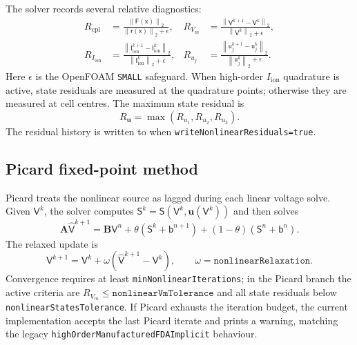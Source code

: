 \documentclass[11pt,a4paper]{article}
\newcommand{\code}[1]{\texttt{\small #1}}
\newcommand{\Vm}{V_m}
\newcommand{\Iion}{I_{\mathrm{ion}}}
\newcommand{\Aimp}{\mathbf{A}}
\newcommand{\Bimp}{\mathbf{B}}
\newcommand{\Fres}{\mathsf{F}}
\newcommand{\norm}[1]{\left\lVert #1 \right\rVert}
\begin{document}
The solver records several relative diagnostics:
\begin{align}
  R_{\mathrm{cpl}} &=
  \frac{\norm{\Fres(\mathsf{x})}_2}
       {\norm{\mathsf{r}(\mathsf{x})}_2+\epsilon},
  &
  R_{\Vm} &=
  \frac{\norm{\mathsf{V}^{k+1}-\mathsf{V}^{k}}_2}
       {\norm{\mathsf{V}^{k}}_2+\epsilon},\\
  R_{\Iion} &=
  \frac{\norm{\mathsf{I}^{k+1}_{\mathrm{ion}}-\mathsf{I}^{k}_{\mathrm{ion}}}_2}
       {\norm{\mathsf{I}^{k}_{\mathrm{ion}}}_2+\epsilon},
  &
  R_{u_j} &=
  \frac{\norm{\mathsf{u}^{k+1}_{j}-\mathsf{u}^{k}_{j}}_2}
       {\norm{\mathsf{u}^{k}_{j}}_2+\epsilon}.
\end{align}
Here $\epsilon$ is the OpenFOAM \code{SMALL} safeguard. When high-order
$\Iion$ quadrature is active, state residuals are measured at the quadrature
points; otherwise they are measured at cell centres. The maximum state residual
is
\begin{equation}
  R_{\mathbf{u}}=\max(R_{u_1},R_{u_2},R_{u_3}).
\end{equation}
The residual history is written to
when \code{writeNonlinearResiduals=true}.

\subsection{Picard fixed-point method}

Picard treats the nonlinear source as lagged during each linear voltage solve.
Given $\mathsf{V}^{k}$, the solver computes
$\mathsf{S}^{k}=\mathsf{S}(\mathsf{V}^{k},\mathbf{u}(\mathsf{V}^{k}))$ and then
solves
\begin{equation}
  \Aimp \widehat{\mathsf{V}}^{k+1}
  =
  \Bimp\mathsf{V}^{n}
  +\theta(\mathsf{S}^{k}+\mathsf{b}^{n+1})
  +(1-\theta)(\mathsf{S}^{n}+\mathsf{b}^{n}).
\end{equation}
The relaxed update is
\begin{equation}
  \mathsf{V}^{k+1}
  =
  \mathsf{V}^{k}
  +
  \omega\left(\widehat{\mathsf{V}}^{k+1}-\mathsf{V}^{k}\right),
  \qquad
  \omega=\texttt{nonlinearRelaxation}.
\end{equation}
Convergence requires at least \code{minNonlinearIterations}; in the Picard
branch the active criteria are $R_{\Vm}\le\texttt{nonlinearVmTolerance}$ and
all state residuals below \code{nonlinearStatesTolerance}. If Picard exhausts
the iteration budget, the current implementation accepts the last Picard
iterate and prints a warning, matching the legacy
\code{highOrderManufacturedFDAImplicit} behaviour.
\end{document}
